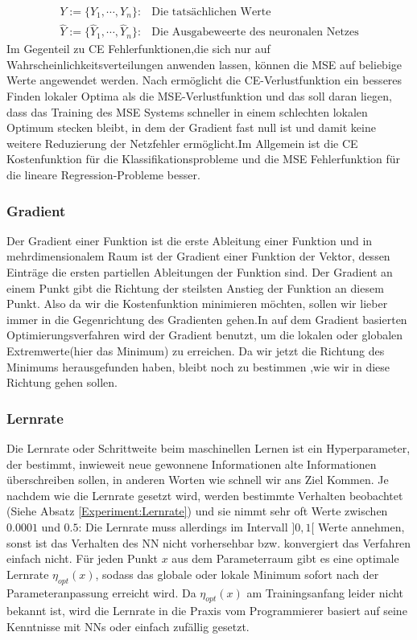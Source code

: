 \documentclass[12pt,a4paper]{scrartcl}
\numberwithin{equation}{section}
\begin{document}
\begin{align*}
Y:=\{Y_1,\cdots, Y_n\} :&\text{Die tatsächlichen Werte} \\
\widehat{Y}:=\{\widehat{Y}_1,\cdots, \widehat{Y}_n\} :&\text{Die Ausgabeweerte des neuronalen Netzes}
\end{align*}
Im Gegenteil zu CE Fehlerfunktionen,die sich nur auf Wahrscheinlichkeitsverteilungen anwenden lassen, können die MSE auf beliebige Werte angewendet werden. Nach \cite[Pavel et al]{7} ermöglicht die CE-Verlustfunktion ein besseres Finden lokaler Optima als die MSE-Verlustfunktion und das soll daran liegen, dass das Training des MSE Systems schneller in einem schlechten lokalen Optimum stecken bleibt, in dem der Gradient fast null ist und damit keine weitere Reduzierung der Netzfehler ermöglicht.Im Allgemein ist die CE Kostenfunktion für die Klassifikationsprobleme und die MSE Fehlerfunktion für die lineare Regression-Probleme besser.

\subsubsection{ Gradient}\label{Gradient}
Der Gradient einer Funktion ist die erste Ableitung einer Funktion und in mehrdimensionalem Raum ist der Gradient einer Funktion der Vektor, dessen Einträge  die ersten partiellen Ableitungen der Funktion sind. Der Gradient an einem Punkt gibt die Richtung der steilsten Anstieg der Funktion an diesem Punkt.  Also da wir die Kostenfunktion minimieren möchten, sollen wir lieber immer in die Gegenrichtung des Gradienten gehen.In auf dem Gradient basierten Optimierungsverfahren wird der Gradient benutzt, um die lokalen oder globalen Extremwerte(hier das Minimum) zu erreichen.
Da wir jetzt die Richtung des Minimums herausgefunden haben, bleibt noch zu bestimmen ,wie wir in diese Richtung gehen  sollen.

\subsubsection{Lernrate}\label{Lernrate}
Die Lernrate oder Schrittweite beim maschinellen Lernen ist ein Hyperparameter, der bestimmt, inwieweit neue gewonnene Informationen alte Informationen überschreiben sollen\cite{LearningRate}, in anderen Worten wie schnell wir ans Ziel Kommen.
Je nachdem wie die Lernrate gesetzt wird, werden bestimmte Verhalten beobachtet (Siehe Absatz \ref{Experiment:Lernrate}) und sie nimmt sehr oft Werte zwischen $ 0.0001 $ und $ 0.5 $:
Die Lernrate muss allerdings im Intervall  $]0,1[$ Werte annehmen, sonst ist das Verhalten des \ac{NN} nicht vorhersehbar bzw. konvergiert das Verfahren einfach nicht.
Für jeden Punkt $ x $ aus dem Parameterraum gibt es eine optimale Lernrate $ \eta_{opt}(x) $, sodass das globale oder lokale Minimum sofort nach der Parameteranpassung erreicht wird. Da $ \eta_{opt}(x) $ am Trainingsanfang leider nicht bekannt ist, wird die Lernrate in die Praxis vom Programmierer basiert auf seine Kenntnisse mit \acsp{NN} oder einfach zufällig gesetzt.
\end{document}
